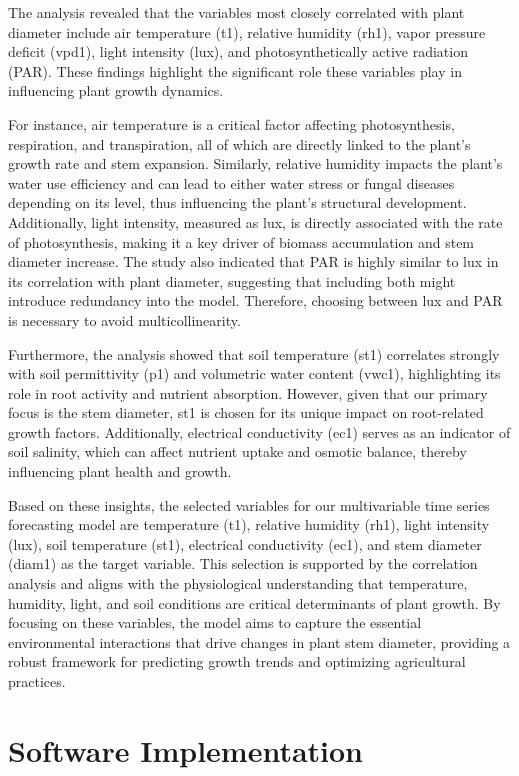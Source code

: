 The analysis revealed that the variables most closely correlated with plant diameter include air temperature (t1), relative humidity (rh1), vapor pressure deficit (vpd1), light intensity (lux), and photosynthetically active radiation (PAR). These findings highlight the significant role these variables play in influencing plant growth dynamics.

For instance, air temperature is a critical factor affecting photosynthesis, respiration, and transpiration, all of which are directly linked to the plant's growth rate and stem expansion. Similarly, relative humidity impacts the plant's water use efficiency and can lead to either water stress or fungal diseases depending on its level, thus influencing the plant's structural development. Additionally, light intensity, measured as lux, is directly associated with the rate of photosynthesis, making it a key driver of biomass accumulation and stem diameter increase. The study also indicated that PAR is highly similar to lux in its correlation with plant diameter, suggesting that including both might introduce redundancy into the model. Therefore, choosing between lux and PAR is necessary to avoid multicollinearity.

Furthermore, the analysis showed that soil temperature (st1) correlates strongly with soil permittivity (p1) and volumetric water content (vwc1), highlighting its role in root activity and nutrient absorption. However, given that our primary focus is the stem diameter, st1 is chosen for its unique impact on root-related growth factors. Additionally, electrical conductivity (ec1) serves as an indicator of soil salinity, which can affect nutrient uptake and osmotic balance, thereby influencing plant health and growth.

Based on these insights, the selected variables for our multivariable time series forecasting model are temperature (t1), relative humidity (rh1), light intensity (lux), soil temperature (st1), electrical conductivity (ec1), and stem diameter (diam1) as the target variable. This selection is supported by the correlation analysis and aligns with the physiological understanding that temperature, humidity, light, and soil conditions are critical determinants of plant growth. By focusing on these variables, the model aims to capture the essential environmental interactions that drive changes in plant stem diameter, providing a robust framework for predicting growth trends and optimizing agricultural practices.


\section{Software Implementation}

